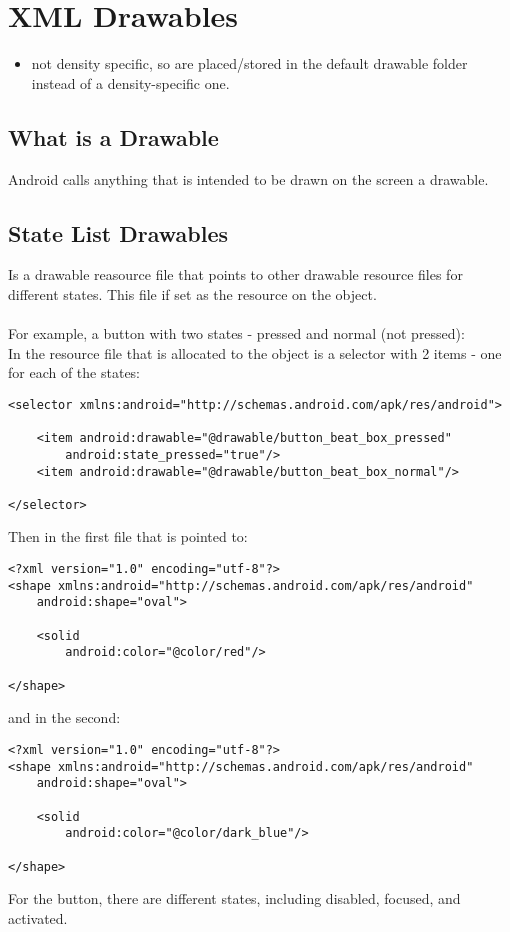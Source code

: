 \documentclass[]{article}
\begin{document}
\section{XML Drawables}
\begin{itemize}
	\item not density specific, so are placed/stored in the default drawable folder instead of a density-specific one.
\end{itemize}
\subsection{What is a Drawable}
Android calls anything that is intended to be drawn on the screen a drawable.

\subsection{State List Drawables}
Is a drawable reasource file that points to other drawable resource files for different states.  This file if set as the resource on the object.
\\\\
For example, a button with two states - pressed and normal (not pressed):
\\
In the resource file that is allocated to the object is a selector with 2 items - one for each of the states:
\begin{lstlisting}
<selector xmlns:android="http://schemas.android.com/apk/res/android">

	<item android:drawable="@drawable/button_beat_box_pressed"
		android:state_pressed="true"/>
	<item android:drawable="@drawable/button_beat_box_normal"/>

</selector>
\end{lstlisting}
Then in the first file that is pointed to:
\begin{lstlisting}
<?xml version="1.0" encoding="utf-8"?>
<shape xmlns:android="http://schemas.android.com/apk/res/android"
	android:shape="oval">

	<solid
		android:color="@color/red"/>

</shape>
\end{lstlisting}
and in the second:
\begin{lstlisting}
<?xml version="1.0" encoding="utf-8"?>
<shape xmlns:android="http://schemas.android.com/apk/res/android"
	android:shape="oval">

	<solid
		android:color="@color/dark_blue"/>

</shape>
\end{lstlisting}
For the button, there are different states, including disabled, focused, and activated.
\end{document}
